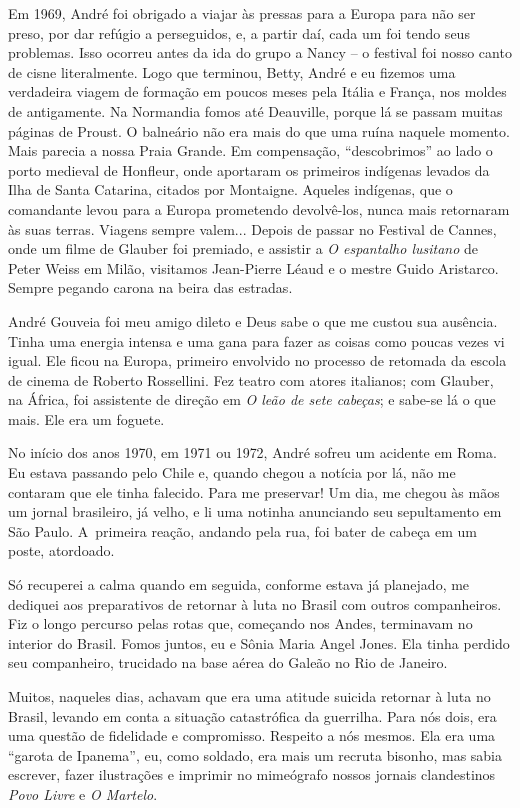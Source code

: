 {Em 1969, André foi obrigado a viajar às pressas para a Europa para não
ser preso, por dar refúgio a perseguidos, e, a partir daí, cada um
foi tendo seus problemas. Isso ocorreu antes da ida do grupo a
Nancy -- o festival foi nosso canto de cisne literalmente. Logo que
terminou, Betty, André e eu fizemos uma verdadeira viagem de formação em
poucos meses pela Itália e França, nos moldes de antigamente. Na
Normandia fomos até Deauville, porque lá se passam muitas páginas de
Proust. O balneário não era mais do que uma ruína naquele momento. Mais
parecia a nossa Praia Grande. Em compensação,
“descobrimos” ao lado o porto medieval de Honfleur, onde aportaram os
primeiros indígenas levados da Ilha de Santa Catarina, citados
por Montaigne. Aqueles indígenas, que o comandante levou para a Europa
prometendo devolvê-los, nunca mais retornaram às suas terras. Viagens
sempre valem... Depois de passar no Festival de Cannes, onde um filme de
Glauber foi premiado, e assistir a {\it O espantalho lusitano} de Peter
Weiss em Milão, visitamos Jean-Pierre Léaud e o mestre Guido Aristarco.
Sempre pegando carona na beira das estradas.

André Gouveia foi meu amigo dileto e Deus sabe o que me custou sua
ausência. Tinha uma energia intensa e uma gana para fazer as coisas como
poucas vezes vi igual. Ele ficou na Europa, primeiro envolvido no
processo de retomada da escola de cinema de Roberto Rossellini. Fez
teatro com atores italianos; com Glauber, na África, foi assistente de
direção em {\it O leão de sete cabeças}; e sabe-se lá o que mais. Ele
era um foguete.

No início dos anos 1970, em 1971 ou 1972, André sofreu um acidente em Roma.
Eu estava passando pelo Chile e, quando chegou a notícia por lá, não me
contaram que ele tinha falecido. Para me preservar! Um dia, me chegou às
mãos um jornal brasileiro, já velho, e li uma notinha anunciando seu
sepultamento em São Paulo. A~primeira reação, andando pela rua, foi
bater de cabeça em um poste, atordoado.

Só recuperei a calma quando em seguida, conforme estava já planejado, me
dediquei aos preparativos de retornar à luta no Brasil com outros
companheiros. Fiz o longo percurso pelas rotas que, começando nos Andes,
terminavam no interior do Brasil. Fomos juntos, eu e Sônia Maria Angel
Jones. Ela tinha perdido seu companheiro, trucidado na base aérea do
Galeão no Rio de Janeiro.

Muitos, naqueles dias, achavam que era uma atitude suicida retornar à
luta no Brasil, levando em conta a situação catastrófica da guerrilha.
Para nós dois, era uma questão de fidelidade e compromisso. Respeito a
nós mesmos. Ela era uma “garota de Ipanema”, eu, como soldado, era mais um
recruta bisonho, mas sabia escrever, fazer ilustrações e imprimir no
mimeógrafo nossos jornais clandestinos {\it Povo Livre} e {\it O
Martelo}.

}
